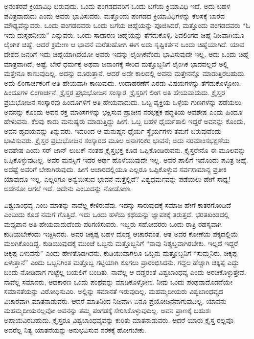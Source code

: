 \vskip 0.2cm

ಅನಂತರವೆ ಕ್ರಿಯಾವಿಧಿ ಬರುವುದು. ಒಂದು ಪಂಗಡದವರಿಗೆ ಒಂದು ಬಗೆಯ ಕ್ರಿಯಾವಿಧಿ ಇದೆ. ಅದು ಬಹಳ ಪವಿತ್ರವಾದುದು ಎಂದು ಅವರು ಭಾವಿಸುವರು. ಮತ್ತೊಂದು ಪಂಗಡದ ಕ್ರಿಯಾವಿಧಿಗಳನ್ನು ಕೆಲಸಕ್ಕೆ ಬಾರದ ಮೌಢ್ಯವೆನ್ನುವರು. ಒಂದು ಪಂಗಡದವರು ಒಂದು ಬಗೆಯ ಚಿಹ್ನೆಯನ್ನು ಪೂಜಿಸಿದರೆ, ಮತ್ತೊಂದು ಪಂಗಡದವರು “ಓ ಇದು ದುಸ್ಸಹನೀಯ” ಎನ್ನುವರು. ಒಂದು ಸಾಧಾರಣ ಚಿಹ್ನೆಯನ್ನು ತೆಗೆದುಕೊಳ್ಳಿ. ಶಿವಲಿಂಗದ ಚಿಹ್ನೆ ನಿಜವಾಗಿಯೂ ಲೈಂಗಿಕ ಚಿಹ್ನೆ. ಆದರೆ ಕ್ರಮೇಣ ಆ ಭಾವನೆ ಮರೆತುಹೋಗಿ ಈಗ ಅದು ಸೃಷ್ಟಿಕರ್ತನ ಒಂದು ಚಿಹ್ನೆಯಾಗಿದೆ. ಯಾವ ದೇಶದ ಜನರಿಗೆ ಇದು ಚಿಹ್ನೆಯಾಗಿದೆಯೋ ಅವರು ಇದನ್ನು ಲೈಂಗಿಕವೆಂದು ಭಾವಿಸುವುದೇ ಇಲ್ಲ. ಅದು ಒಂದು ಚಿಹ್ನೆ ಮಾತ್ರವಾಗಿದೆ, ಅಷ್ಟೆ. ಬೇರೆ ಧರ್ಮಕ್ಕೆ ಅಥವಾ ಜನಾಂಗಕ್ಕೆ ಸೇರಿದ ಮತ್ತೊಬ್ಬನಿಗೆ ಲೈಂಗಿಕ ಭಾವವಲ್ಲದೆ ಅಲ್ಲಿ ಮತ್ತೇನೂ ಕಾಣುವುದಿಲ್ಲ. ಅದನ್ನು ದೂರುತ್ತಾನೆ. ಆದರೆ ಅದೇ ಕಾಲದಲ್ಲಿ ಅವನು ಮತ್ತೇನನ್ನೊ ಮಾಡುತ್ತಿರಬಹುದು. ಅದು ಲಿಂಗಾರ್ಚಕರಿಗೆ ಅತಿ ಹೇಯವಾಗಿ ಕಾಣುವುದು. ಉದಾಹರಣೆಗೆ ಎರಡು ವಿಷಯಗಳನ್ನು ತೆಗೆದುಕೊಳ್ಳೋಣ: ಹಿಂದೂಗಳ ಲಿಂಗಾರ್ಚನೆ, ಕ್ರೈಸ್ತರ ಪ್ರಭುಭೋಜನ ಸಂಸ್ಕಾರ. ಕ್ರೈಸ್ತರಿಗೆ ಲಿಂಗ ಅತಿ ಹೇಯವಾದುದು. ಕ್ರೈಸ್ತರ ಪ್ರಭುಭೋಜನ ಸಂಸ್ಕಾರವು ಹಿಂದೂಗಳಿಗೆ ಅತಿ ಹೇಯವಾದುದು. ಒಬ್ಬ ವ್ಯಕ್ತಿಯ ಒಳ್ಳೆಯ ಗುಣಗಳನ್ನು ಪಡೆಯಲು ಅವನನ್ನು ಕೊಂದು ಅವನ ರಕ್ತ ಮಾಂಸಗಳನ್ನು ಭಕ್ಷಿಸುವ ಪ್ರಾಚೀನ ನರಭಕ್ಷಕ ಪದ್ಧತಿಯ ಅವಶೇಷ ಎಂದು ಹಿಂದೂ ಹೇಳುವನು. ಕೆಲವು ಕಾಡು ಮನುಷ್ಯರು ಮಾಡುತ್ತಿದ್ದು ಹೀಗೆ. ಒಬ್ಬ ಬಹಳ ಧೈರ್ಯಶಾಲಿ ಇದ್ದರೆ ಅವನನ್ನು ಕೊಂದು, ಅವನ ಹೃದಯವನ್ನು ತಿನ್ನುವರು. ಇದರಿಂದ ಆ ಮನುಷ್ಯನ ಧೈರ್ಯ ಸ್ಥೈರ್ಯಗಳು ತಮಗೆ ಬರುವುವೆಂದು ಭಾವಿಸುವರು. ಕ್ರೈಸ್ತರ ಪ್ರಭುಭೋಜನ ಸಂಸ್ಕಾರದ ಮೂಲ ಅನಾಗರಿಕರ ಭಾವನೆ; ಅದು ನರಮಾಂಸಭಕ್ಷಣೆಯ ಅವಶೇಷ ಎಂದು ಸರ್​ ಜಾನ್​ ಲುಬಕ್​ ನಂತಹ ಕ್ರೈಸ್ತಭಕ್ತ ಕೂಡ ಒಪ್ಪಿಕೊಂಡಿರುವನು. ಕ್ರೈಸ್ತರೇನೊ ಈ ಮೂಲವನ್ನು ಒಪ್ಪಿಕೊಳ್ಳುವುದಿಲ್ಲ. ಅವರ ಮನಸ್ಸಿಗೆ ಇದರ ಅರ್ಥ ಹೊಳೆಯುವುದೇ ಇಲ್ಲ. ಅವರ ಪಾಲಿಗೆ ಇದೊಂದು ಪವಿತ್ರ ಚಿಹ್ನೆ. ಅದಷ್ಟೆ ಅವರಿಗೆ ಬೇಕಾಗಿರುವುದು. ಹೀಗೆ ಆಚಾರದಲ್ಲಿಯೂ ಎಲ್ಲರೂ ಒಪ್ಪಿಕೊಳ್ಳುವ ಸರ್ವಸಾಮಾನ್ಯ ಪ್ರತೀಕ ಯಾವುದೂ ಇಲ್ಲ. ಎಲ್ಲರಿಗೂ ಅನ್ವಯಿಸುವ ಭಾವನೆ ಮತ್ತೆಲ್ಲಿದೆ? ವಿಶ್ವಧರ್ಮವನ್ನು ಪಡೆಯಲು ಹೇಗೆ ಸಾಧ್ಯ! ಅದೇನೋ ಆಗಲೆ ಇದೆ. ಅದೇನು ಎಂಬುದನ್ನು ನೋಡೋಣ.

\vskip 0.2cm

ವಿಶ್ವಬಾಂಧವ್ಯ ಎಂಬ ಮಾತನ್ನು ನಾವೆಲ್ಲ ಕೇಳಿರುವೆವು. ಇದನ್ನು ಸಾರುವುದಕ್ಕೆ ಸಮಾಜ ಹೇಗೆ ಕಾತರಗೊಂಡಿದೆ ಎಂಬುದು ಕೂಡ ನಮಗೆ ಗೊತ್ತಿದೆ. ಇದು ಒಂದು ಹಳೆಯ ಕಥೆಯನ್ನು ಜ್ಞಾಪಕಕ್ಕೆ ತರುತ್ತದೆ. ಭರತಖಂಡದಲ್ಲಿ ಮದ್ಯಪಾನ ಅತಿ ಹೇಯವಾದುದೆಂದು ಪರಿಗಣಿಸುವರು. ಇಬ್ಬರು ಸಹೋದರರು ಒಂದು ರಾತ್ರಿ ರಹಸ್ಯವಾಗಿ ಕುಡಿಯಬೇಕೆಂದು ಇಚ್ಛಿಸಿದರು. ಅವರ ಚಿಕ್ಕಪ್ಪ ಬಹಳ ದೊಡ್ಡ ಆಚಾರವಂತ. ಆತ ಅವರ ಕೋಣೆಯ ಪಕ್ಕದಲ್ಲಿಯೆ ಮಲಗಿಕೊಂಡಿದ್ದ. ಕುಡಿಯುವುದಕ್ಕೆ ಮುಂಚೆ ಒಬ್ಬನು ಮತ್ತೊಬ್ಬನಿಗೆ “ನಾವು ನಿಶ್ಯಬ್ದವಾಗಿರಬೇಕು. ಇಲ್ಲದೆ ಇದ್ದರೆ ಚಿಕ್ಕಪ್ಪ ಏಳುವನು” ಎಂದು ಹೇಳತೊಡಗಿದನು. ಕುಡಿಯುವಾಗಲೂ ಒಬ್ಬನು ಮತ್ತೊಬ್ಬನಿಗೆ “ಸುಮ್ಮನಿರು, ಚಿಕ್ಕಪ್ಪ ಏಳುತ್ತಾನೆ” ಎಂದು ಒಬ್ಬನಿಗಿಂತ ಮತ್ತೊಬ್ಬ ಗಟ್ಟಿಯಾಗಿ ಕೂಗಲು ಪ್ರಾರಂಭಿಸಿದನು. ಗದ್ದಲ ಹೆಚ್ಚಾಗಿ ಚಿಕ್ಕಪ್ಪ ಎದ್ದು ಬಂದು ನೋಡಿದಾಗ ಗುಟ್ಟೆಲ್ಲ ಬಯಲಿಗೆ ಬಂದಿತು. ನಾವೆಲ್ಲ ಆ ದಡ್ಡರಂತೆ ವಿಶ್ವಬಾಂಧವ್ಯ ಎಂದು ಅರಚಿಕೊಳ್ಳುತ್ತೇವೆ. ನಾವೆಲ್ಲ ಸಮಾನರು, ಆದಕಾರಣ ಒಂದು ಪಂಥವನ್ನು ಮಾಡಿಕೊಳ್ಳೋಣ. ನೀವು ಒಂದು ಪಂಥವಾದೊಡನೆಯೇ ಸಮಾನತೆಯನ್ನು ವಿರೋಧಿಸುವಿರಿ. ಅಲ್ಲಿನ್ನು ಸಮಾನತೆ ಇರುವುದಿಲ್ಲ. ಮಹಮ್ಮದೀಯರು ವಿಶ್ವಬಾಂಧವ್ಯದ ವಿಚಾರವಾಗಿ ಮಾತನಾಡುವರು. ಆದರೆ ಮಾತಿನಿಂದ ನಿಜವಾಗಿ ಏನೂ ಪ್ರಯೋಜನವಾಗುವುದಿಲ್ಲ. ಯಾವನು ಮಹಮ್ಮದೀಯನಲ್ಲವೋ ಅವನನ್ನು ತಮ್ಮ ಪಂಗಡಕ್ಕೆ ಸೇರಿಸಿಕೊಳ್ಳುವುದಿಲ್ಲ. ಅವನ ಪ್ರಾಣಕ್ಕೆ ಬಹುಶಃ ಅಪಾಯವಿರಬಹುದು. ಕ್ರೈಸ್ತರೂ ವಿಶ್ವಬಾಂಧವ್ಯವನ್ನು ಕುರಿತು ಮಾತನಾಡುವರು. ಆದರೆ ಯಾರು ಕ್ರೈಸ್ತ ರಲ್ಲವೊ ಅವರೆಲ್ಲ ನಿತ್ಯ ಯಾತನೆಯನ್ನು ಅನುಭವಿಸುವ ನರಕಕ್ಕೆ ಹೋಗಬೇಕು.

